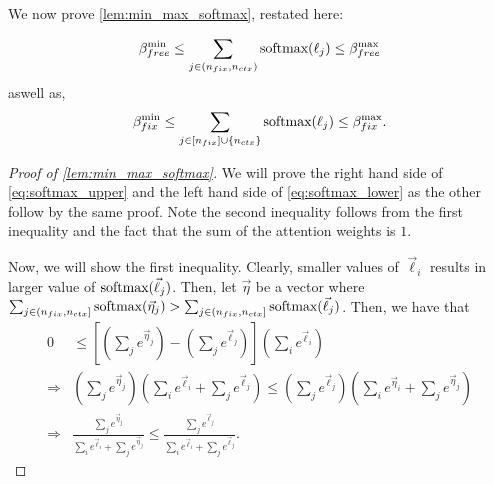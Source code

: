 We now prove \cref{lem:min_max_softmax}, restated here:

\begin{lemma}
	\begin{equation}
		\label{eq:softmax_upper}
		{\beta}_{free}^{\min} \leq
		\sum_{j \in (n_{fix}, {n_{ctx}})} \text{softmax}(\ell_j) \leq
		{\beta}_{free}^{\max}
	\end{equation}
	aswell as,
	\begin{align}
		\label{eq:softmax_lower}
		{\beta}_{fix}^{\min} \leq
		\sum_{j \in [n_{fix}] \cup \{{n_{ctx}}\}} \text{softmax}(\ell_j) \leq
		{\beta}_{fix}^{\max}.
	\end{align}
\end{lemma}
\begin{proof}[Proof of \cref{lem:min_max_softmax}]
	We will prove the right hand side of \cref{eq:softmax_upper} and the left hand side of \cref{eq:softmax_lower} as the other follow by the same proof.
	Note the second inequality follows from the first inequality and the fact that the sum of the attention weights is $1$.

	Now, we will show the first inequality.
	Clearly, smaller values of $\vec{\ell}_i$ results in larger value of $\text{softmax}(\vec{\ell}_j)$.
	Then, let $\vec{\eta}$ be a vector where $\sum_{j \in (n_{fix}, {n_{ctx}}]} \text{softmax}(\vec{\eta}_j) > \sum_{j \in (n_{fix}, {n_{ctx}}]} \text{softmax}(\vec{\ell}_j)$.
	Then, we have that
	\begin{align*}
		0 &\leq \left[\left(\sum_j e^{\vec{\eta}_j}\right) - \left(\sum_j e^{\vec{\ell}_j}\right)\right] \left(\sum_i e^{\vec{\ell}_i}\right)  \\
		\Rightarrow &\left(\sum_j e^{\vec{\eta}_j} \right)\left(\sum_i e^{\vec{\ell}_i} + \sum_j e^{\vec{\ell}_j} \right) \leq
        \left(\sum_j e^{\vec{\ell}_j}\right) \left(\sum_i e^{\vec{\eta}_i} + \sum_j e^{\vec{\eta}_j}\right) \\
		\Rightarrow & \frac{\sum_j e^{\vec{\eta}_j}}{\sum_i e^{\vec{\ell}_i} + \sum_j e^{\vec{\eta}_j}} \leq 
        \frac{\sum_j e^{\vec{\ell}_j}}{\sum_i e^{\vec{\ell}_i} + \sum_j e^{\vec{\ell}_j}}.
	\end{align*}
\end{proof}

